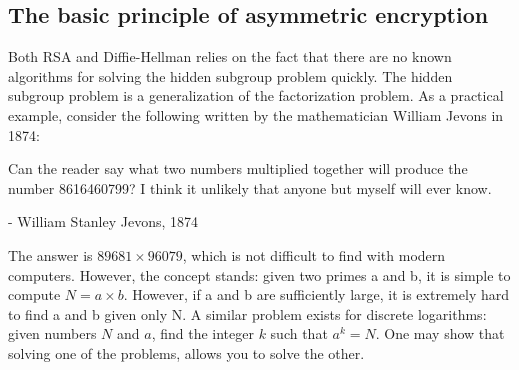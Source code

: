 \documentclass[conference]{IEEEtran}
\begin{document}

\subsection{The basic principle of asymmetric encryption}
Both RSA and Diffie-Hellman relies on the fact that there are no known algorithms for solving the hidden subgroup problem quickly.
The hidden subgroup problem is a generalization of the factorization problem.
As a practical example, consider the following written by the mathematician William Jevons in 1874\cite{oldMathGuy}:
\begin{quoting}
Can the reader say what two numbers multiplied together will produce the number 8616460799? I think it unlikely that anyone but myself will ever know.
 
- William Stanley Jevons, 1874
\end{quoting}
The answer is $89681 \times 96079$, which is not difficult to find with modern computers.
However, the concept stands: given two primes a and b, it is simple to compute $N = a \times b$.
However, if a and b are sufficiently large, it is extremely hard to find a and b given only N.
A similar problem exists for discrete logarithms: given numbers $N$ and $a$, find the integer $k$ such that $a^k = N$.
One may show that solving one of the problems, allows you to solve the other.
\end{document}
